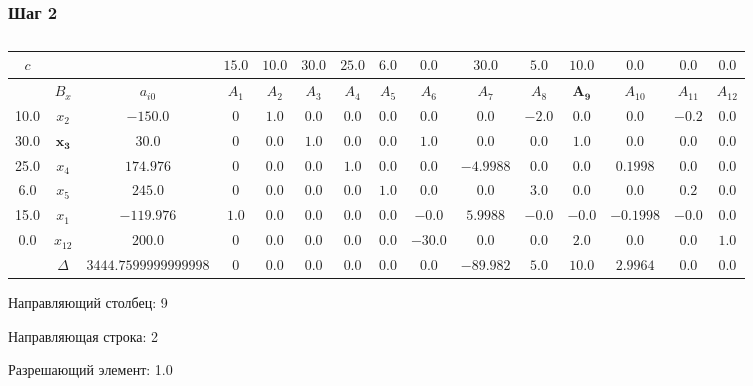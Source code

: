 \begin{landscape}

\subsubsection{Шаг 2}

\begin{table}[H]
	\centering
	\normalsize
	\caption{}
	\label{tbl:1}
	\begin{tabular}{|c|c|c|c|c|c|c|c|c|c|c|c|c|c|c|}
		\hline
		$c$&&&$15.0$&$10.0$&$30.0$&$25.0$&$6.0$&$0.0$&$30.0$&$5.0$&$10.0$&$0.0$&$0.0$&$0.0$\\ \hline
		&$B_x$&$a_{i0}$&$A_{1}$&$A_{2}$&$A_{3}$&$A_{4}$&$A_{5}$&$A_{6}$&$A_{7}$&$A_{8}$&$\mathbf{A_{9}}$&$A_{10}$&$A_{11}$&$A_{12}$\\ \hline
		10.0&$x_{2}$&$-150.0$&$0$&$1.0$&$0.0$&$0.0$&$0.0$&$0.0$&$0.0$&$-2.0$&$0.0$&$0.0$&$-0.2$&$0.0$\\ \hline
		$30.0$&$\mathbf{x_{3}}$&$30.0$&$0$&$0.0$&$1.0$&$0.0$&$0.0$&$1.0$&$0.0$&$0.0$&$\mathbf{1.0}$&$0.0$&$0.0$&$0.0$\\ \hline
		25.0&$x_{4}$&$174.976$&$0$&$0.0$&$0.0$&$1.0$&$0.0$&$0.0$&$-4.9988$&$0.0$&$0.0$&$0.1998$&$0.0$&$0.0$\\ \hline
		6.0&$x_{5}$&$245.0$&$0$&$0.0$&$0.0$&$0.0$&$1.0$&$0.0$&$0.0$&$3.0$&$0.0$&$0.0$&$0.2$&$0.0$\\ \hline
		15.0&$x_{1}$&$-119.976$&$1.0$&$0.0$&$0.0$&$0.0$&$0.0$&$-0.0$&$5.9988$&$-0.0$&$-0.0$&$-0.1998$&$-0.0$&$0.0$\\ \hline
		0.0&$x_{12}$&$200.0$&$0$&$0.0$&$0.0$&$0.0$&$0.0$&$-30.0$&$0.0$&$0.0$&$2.0$&$0.0$&$0.0$&$1.0$\\ \hline
		&$\Delta$&$3444.7599999999998$&$0$&$0.0$&$0.0$&$0.0$&$0.0$&$0.0$&$-89.982$&$5.0$&$10.0$&$2.9964$&$0.0$&$0.0$\\ \hline

\end{tabular}

\end{table}

Направляющий столбец: 9

Направляющая строка: 2

Разрешающий элемент: 1.0

\end{landscape}

